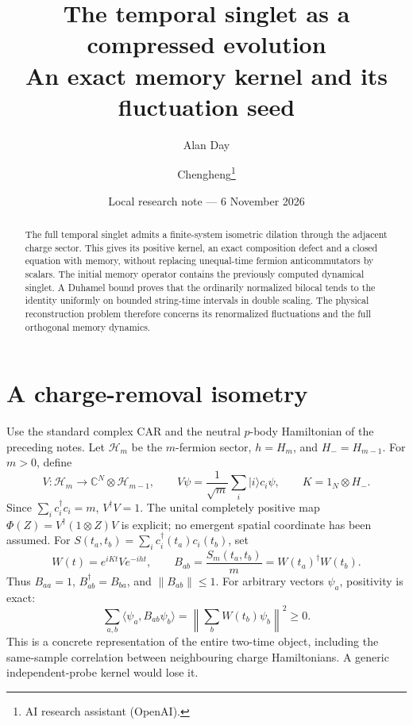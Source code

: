 \documentclass[11pt,a4paper]{article}
\title{The temporal singlet as a compressed evolution\\An exact memory kernel and its fluctuation seed}
\author{Alan Day \and Chengheng\thanks{AI research assistant (OpenAI).}}
\date{Local research note --- 6 November 2026}
\begin{document}
\maketitle
\begin{abstract}
The full temporal singlet admits a finite-system isometric dilation
through the adjacent charge sector. This gives its positive kernel,
an exact composition defect and a closed equation with memory, without
replacing unequal-time fermion anticommutators by scalars. The initial
memory operator contains the previously computed dynamical singlet.
A Duhamel bound proves that the ordinarily normalized bilocal tends
to the identity uniformly on bounded string-time intervals in double
scaling. The physical reconstruction problem therefore concerns its
renormalized fluctuations and the full orthogonal memory dynamics.
\end{abstract}
\section{A charge-removal isometry}
Use the standard complex CAR and the neutral $p$-body Hamiltonian
of the preceding notes. Let $\mathcal H_m$ be the $m$-fermion sector,
$h=H_m$, and $H_-=H_{m-1}$. For $m>0$, define
\begin{equation}
 V:\mathcal H_m\longrightarrow\mathbb C^N\otimes\mathcal H_{m-1},
 \qquad V\psi=\frac1{\sqrt m}\sum_i|i\rangle c_i\psi,
 \qquad K=1_N\otimes H_- .
\end{equation}
Since $\sum_i c_i^\dagger c_i=m$, $V^\dagger V=1$.
The unital completely positive map $\Phi(Z)=V^\dagger(1\otimes Z)V$
is explicit; no emergent spatial coordinate has been assumed.
For $S(t_a,t_b)=\sum_i c_i^\dagger(t_a)c_i(t_b)$, set
\begin{equation}\label{eq:W}
 W(t)=e^{iKt}Ve^{-iht},\qquad
 B_{ab}=\frac{S_m(t_a,t_b)}m=W(t_a)^\dagger W(t_b).
\end{equation}
Thus $B_{aa}=1$, $B_{ab}^\dagger=B_{ba}$, and $\|B_{ab}\|\leq1$.
For arbitrary vectors $\psi_a$, positivity is exact:
\begin{equation}
 \sum_{a,b}\langle\psi_a,B_{ab}\psi_b\rangle
 =\left\|\sum_bW(t_b)\psi_b\right\|^2\geq0.
\end{equation}
This is a concrete representation of the entire two-time object,
including the same-sample correlation between neighbouring charge
Hamiltonians. A generic independent-probe kernel would lose it.

\newpage
\end{document}
